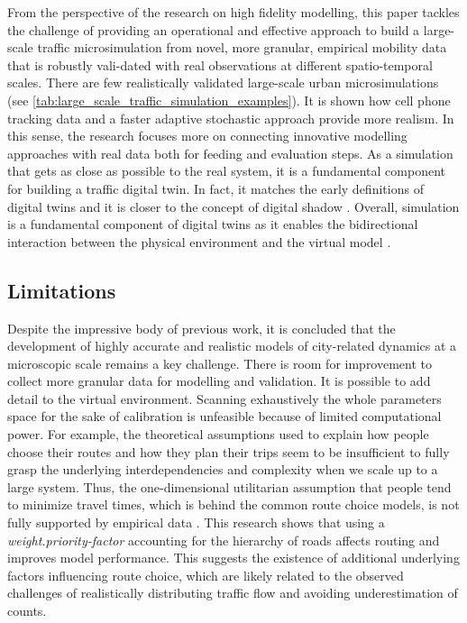 From the perspective of the research on high fidelity modelling, this paper tackles the challenge of providing an operational and effective approach to build a large-scale traffic microsimulation from novel, more granular, empirical mobility data that is robustly vali-dated with real observations at different spatio-temporal scales. There are few realistically validated large-scale urban microsimulations (see \autoref{tab:large_scale_traffic_simulation_examples}). It is shown how cell phone tracking data and a faster adaptive stochastic approach provide more realism. In this sense, the research focuses more on connecting innovative modelling approaches with real data both for feeding and evaluation steps. As a simulation that gets as close as possible to the real system, it is a fundamental component for building a traffic digital twin. In fact, it matches the early definitions of digital twins \citep{Grieves2014,Shafto2012,Rosen2015} and it is closer to the concept of digital shadow \citep{Fuller2020}. Overall, simulation is a fundamental component of digital twins as it enables the bidirectional interaction between the physical environment and the virtual model \citep{Wang2019,Liu2021}.

\subsection{Limitations}

Despite the impressive body of previous work, it is concluded that the development of highly accurate and realistic models of city-related dynamics at a microscopic scale remains a key challenge. There is room for improvement to collect more granular data for modelling and validation. It is possible to add detail to the virtual environment. Scanning exhaustively the whole parameters space for the sake of calibration is unfeasible because of limited computational power. For example, the theoretical assumptions used to explain how people choose their routes and how they plan their trips seem to be insufficient to fully grasp the underlying interdependencies and complexity when we scale up to a large system. Thus, the one-dimensional utilitarian assumption that people tend to minimize travel times, which is behind the common route choice models, is not fully supported by empirical data \citep{Lima2016,Alessandretti2021,Bongiorno2021}. This research shows that using a \emph{weight.priority-factor} accounting for the hierarchy of roads affects routing and improves model performance. This suggests the existence of additional underlying factors influencing route choice, which are likely related to the observed challenges of realistically distributing traffic flow and avoiding underestimation of counts.


